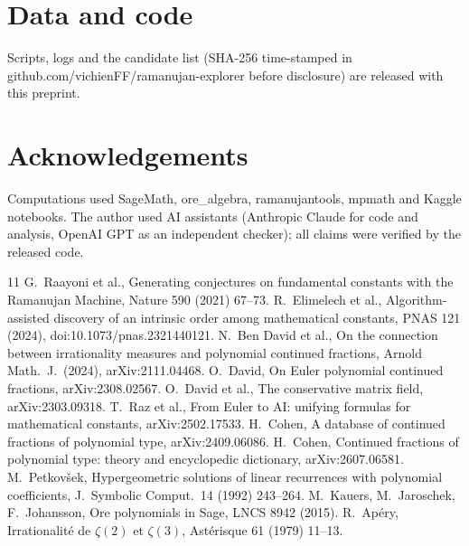 \documentclass[11pt]{article}
\begin{document}
\section*{Data and code}
Scripts, logs and the candidate list (SHA-256 time-stamped in github.com/vichienFF/ramanujan-explorer before disclosure) are
released with this preprint.
\section*{Acknowledgements}
Computations used SageMath, ore\_algebra, ramanujantools, mpmath and Kaggle notebooks. The author used AI assistants (Anthropic
Claude for code and analysis, OpenAI GPT as an independent checker); all claims were verified by the released code.

\begin{thebibliography}{11}
 G.~Raayoni et al., Generating conjectures on fundamental constants with the Ramanujan Machine, Nature 590 (2021) 67--73.
 R.~Elimelech et al., Algorithm-assisted discovery of an intrinsic order among mathematical constants, PNAS 121 (2024), doi:10.1073/pnas.2321440121.
 N.~Ben David et al., On the connection between irrationality measures and polynomial continued fractions, Arnold Math.\ J.\ (2024), arXiv:2111.04468.
 O.~David, On Euler polynomial continued fractions, arXiv:2308.02567.
 O.~David et al., The conservative matrix field, arXiv:2303.09318.
 T.~Raz et al., From Euler to AI: unifying formulas for mathematical constants, arXiv:2502.17533.
 H.~Cohen, A database of continued fractions of polynomial type, arXiv:2409.06086.
 H.~Cohen, Continued fractions of polynomial type: theory and encyclopedic dictionary, arXiv:2607.06581.
 M.~Petkov\v sek, Hypergeometric solutions of linear recurrences with polynomial coefficients, J.\ Symbolic Comput.\ 14 (1992) 243--264.
 M.~Kauers, M.~Jaroschek, F.~Johansson, Ore polynomials in Sage, LNCS 8942 (2015).
 R.~Ap\'ery, Irrationalit\'e de $\zeta(2)$ et $\zeta(3)$, Ast\'erisque 61 (1979) 11--13.
\end{thebibliography}
\end{document}
